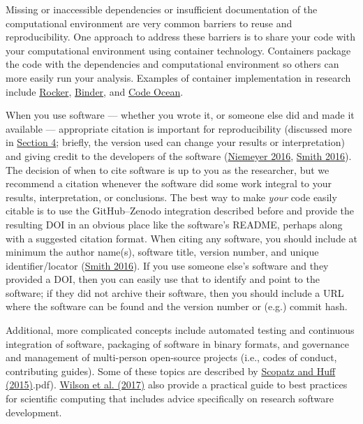 \documentclass{article}
\begin{document}
Missing or inaccessible dependencies or insufficient documentation of the computational environment are very common barriers to reuse and reproducibility. One approach to address these barriers is to share your code with your computational environment using container technology. Containers package the code with the dependencies and computational environment so others can more easily run your analysis. Examples of container implementation in research include \href{https://arxiv.org/abs/1710.03675}{Rocker}, \href{https://mybinder.readthedocs.io/en/latest/}{Binder}, and \href{https://codeocean.com/}{Code Ocean}.


When you use software — whether you wrote it, or someone else did and made it available — appropriate citation is important for reproducibility (discussed more in \href{https://github.com/Open-Science-Training-Handbook/Open-Science-Training-Handbook_EN/blob/master/02OpenScienceBasics/04ReproducibleResearchAndDataAnalysis.md}{Section 4}; briefly, the version used can change your results or interpretation) and giving credit to the developers of the software (\href{https://book.fosteropenscience.eu/en/02OpenScienceBasics/doi.org/10/gc5sjd}{Niemeyer 2016}, \href{https://doi.org/10/bw3g}{Smith 2016}). The decision of when to cite software is up to you as the researcher, but we recommend a citation whenever the software did some work integral to your results, interpretation, or conclusions. The best way to make \emph{your} code easily citable is to use the GitHub–Zenodo integration described before and provide the resulting DOI in an obvious place like the software’s README, perhaps along with a suggested citation format. When citing any software, you should include at minimum the author name(s), software title, version number, and unique identifier/locator (\href{https://doi.org/10/bw3g}{Smith 2016}). If you use someone else’s software and they provided a DOI, then you can easily use that to identify and point to the software; if they did not archive their software, then you should include a URL where the software can be found and the version number or (e.g.) commit hash.


Additional, more complicated concepts include automated testing and continuous integration of software, packaging of software in binary formats, and governance and management of multi-person open-source projects (i.e., codes of conduct, contributing guides). Some of these topics are described by \href{http://lilith.fisica.ufmg.br/~dickman/transfers/comp/textos/Effective%20Computation%20in%20Physics%20(Python}{Scopatz and Huff (2015)}.pdf). \href{https://doi.org/10/gbkbwp}{Wilson et al. (2017)} also provide a practical guide to best practices for scientific computing that includes advice specifically on research software development.
\end{document}
